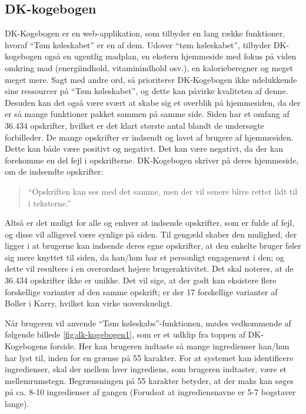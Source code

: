 \subsection{DK-kogebogen}
DK-Kogebogen er en web-applikation, som tilbyder en lang række funktioner, hvoraf ``Tøm køleskabet'' er en af dem. Udover ``tøm køleskabet'', tilbyder DK-kogebogen også en ugentlig madplan, en ekstern hjemmeside med fokus på viden omkring mad (energiindhold, vitaminindhold osv.), en kalorieberegner og meget meget mere. Sagt med andre ord, så prioriterer DK-Kogebogen ikke udelukkende sine ressourcer på ``Tøm køleskabet'', og dette kan påvirke kvaliteten af denne. Desuden kan det også være svært at skabe sig et overblik på hjemmesiden, da der er så mange funktioner pakket sammen på samme side. Siden har et omfang af 36.434 opskrifter, hvilket er det klart største antal blandt de undersøgte forbilleder. De mange opskrifter er indsendt og lavet af brugere af hjemmesiden. Dette kan både være positivt og negativt. Det kan være negativt, da der kan forekomme en del fejl i opskrifterne. DK-Kogebogen skriver på deres hjemmeside, om de indsendte opskrifter:

\begin{quote}
``Opskriften kan ses med det samme, men der vil senere blive rettet lidt til i teksterne.''
\end{quote}

Altså er det muligt for alle og enhver at indsende opskrifter, som er fulde af fejl, og disse vil alligevel være synlige på siden. Til gengæld skaber den mulighed, der ligger i at brugerne kan indsende deres egne opskrifter, at den enkelte bruger føler sig mere knyttet til siden, da han/hun har et personligt engagement i den; og dette vil resultere i en overordnet højere brugeraktivitet. Det skal noteres, at de 36.434 opskrifter ikke er unikke. Det vil sige, at der godt kan eksistere flere forskellige varianter af den samme opskrift; \fx er der 17 forskellige varianter af Boller i Karry, hvilket kan virke uoverskueligt.

Når brugeren vil anvende ``Tøm køleskabs''-funktionen, mødes vedkommende af følgende billede \ref{fig:dk-kogebogen1}, som er et udklip fra toppen af DK-Kogebogens forside. Her kan brugeren indtaste så mange ingredienser han/hun har lyst til, inden for en grænse på 55 karakter. For at systemet kan identificere ingredienser, skal der mellem hver ingrediens, som brugeren indtaster, være et mellemrumstegn. Begrænsningen på 55 karakter betyder, at der maks kan søges på ca. 8-10 ingredienser af gangen (Forudsat at ingrediensnavne er 5-7 bogstaver lange).

